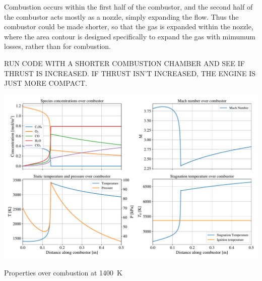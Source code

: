 \documentclass[a4paper]{article}
\begin{document}
Combustion occurs within the first half of the combustor, and the second half of the combustor acts mostly as a nozzle, simply expanding the flow. Thus the combustor could be made shorter, so that the gas is expanded within the nozzle, where the area contour is designed specifically to expand the gas with mimumum losses, rather than for combustion.

RUN CODE WITH A SHORTER COMBUSTION CHAMBER AND SEE IF THRUST IS INCREASED. IF THRUST ISN'T INCREASED, THE ENGINE IS JUST MORE COMPACT.



\begin{widefigure}[10mm]
    \centering
    \includegraphics[width=\linewidth]{part_2_img/subfig_1400.pdf}
    \caption{Properties over combustion at 1400~K}
    \label{fig:properties_1400}
\end{widefigure}
\end{document}
